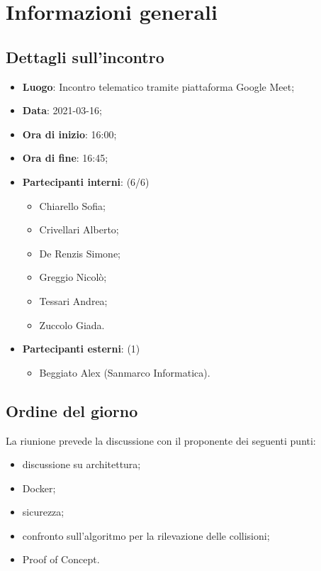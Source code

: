 \section{Informazioni generali}

\subsection{Dettagli sull'incontro}
\begin{itemize}
\item \textbf{Luogo}: Incontro telematico tramite piattaforma Google Meet;
\item \textbf{Data}: 2021-03-16;
\item \textbf{Ora di inizio}: 16:00;
\item \textbf{Ora di fine}: 16:45;
\item \textbf{Partecipanti interni}: (6/6)
\begin{itemize}
	\item Chiarello Sofia;
	\item Crivellari Alberto;
	\item De Renzis Simone;
	\item Greggio Nicolò;
	\item Tessari Andrea;
	\item Zuccolo Giada.
\end{itemize}
\item \textbf{Partecipanti esterni}: (1)
\begin{itemize}
	\item Beggiato Alex (Sanmarco Informatica).
\end{itemize}
\end{itemize}

\subsection{Ordine del giorno}

La riunione prevede la discussione con il proponente dei seguenti punti:
\begin{itemize}
	\item discussione su architettura;
	\item Docker;
	\item sicurezza;
	\item confronto sull'algoritmo per la rilevazione delle collisioni;
	\item Proof of Concept.
\end{itemize}




